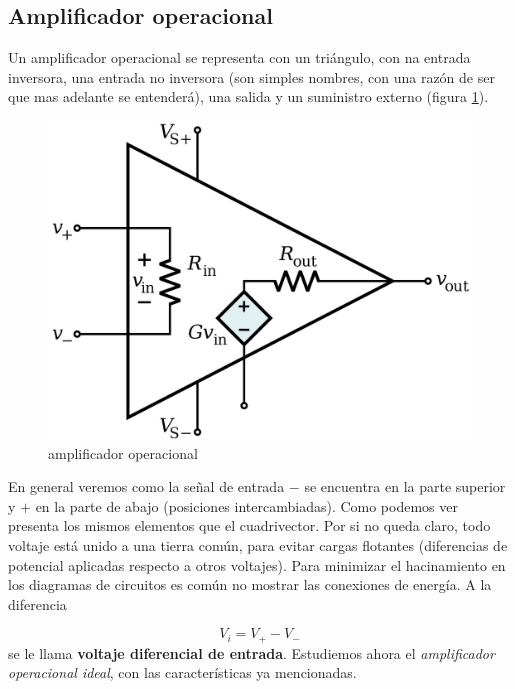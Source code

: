 \documentclass[12pt,a4paper]{article}
\numberwithin{equation}{section}
\numberwithin{figure}{section}
\begin{document}
\subsection{Amplificador operacional}

Un amplificador operacional se representa con un triángulo, con na entrada inversora, una entrada no inversora (son simples nombres, con una razón de ser que mas adelante se entenderá), una salida y un suministro externo (figura \ref{Fig:1.2-Amplificador}). \\


\begin{figure}[h!] \centering
\includegraphics[scale=0.10]{1.2-Amplificador.png}
\caption{amplificador operacional}
\label{Fig:1.2-Amplificador}
\end{figure}

En general veremos como la señal de entrada $-$ se encuentra en la parte superior y $+$ en la parte de abajo (posiciones intercambiadas). Como podemos ver presenta los mismos elementos que el cuadrivector. Por si no queda claro, todo voltaje está unido a una tierra común, para evitar cargas flotantes (diferencias de potencial aplicadas respecto a otros voltajes). Para minimizar el hacinamiento en los diagramas de circuitos es común no mostrar las conexiones de energía. A la diferencia

\begin{equation}
V_i = V_+ - V_-
\end{equation}
se le llama \textbf{voltaje diferencial de entrada}. Estudiemos ahora el \textit{amplificador operacional ideal}, con las características ya mencionadas.
\end{document}
